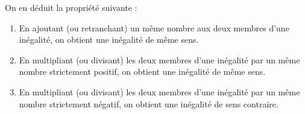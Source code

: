 \begin{intgr}{}{}
\begin{minipage}[c]{\linewidth}
\begin{minipage}[c]{0.3\linewidth}
\noindent{}
\end{minipage}
\end{minipage}
\end{intgr}

On en déduit la propriété suivante :
\vspace*{5pt}\begin{prp}{}{}
\begin{enumerate}
\item En ajoutant (ou retranchant) un même nombre aux deux membres d'une inégalité, on obtient une inégalité de même sens. %
\item En multipliant (ou divisant) les deux membres d'une inégalité par un même nombre strictement positif, on obtient une inégalité de même sens. %
\item En multipliant (ou divisant) les deux membres d'une inégalité par un même nombre strictement négatif, on obtient une inégalité de sens contraire.%
\end{enumerate}
\end{prp}
%
%
%
